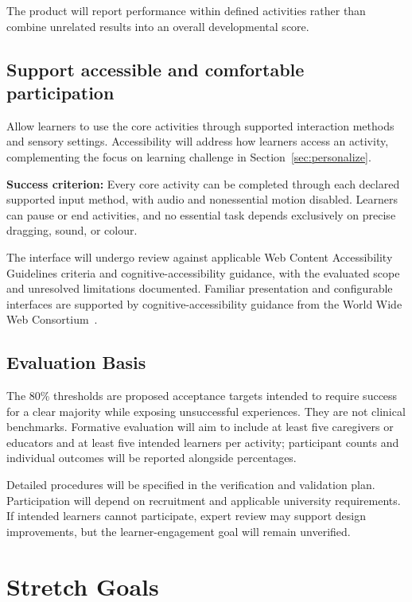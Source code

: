 \documentclass{article}
\begin{document}
The product will report performance within defined activities rather than
combine unrelated results into an overall developmental score.

\subsection{Support accessible and comfortable participation}

Allow learners to use the core activities through supported interaction methods
and sensory settings. Accessibility will address how learners access an
activity, complementing the focus on learning challenge in
Section~\ref{sec:personalize}.

\textbf{Success criterion:} Every core activity can be completed through each
declared supported input method, with audio and nonessential motion disabled.
Learners can pause or end activities, and no essential task depends exclusively
on precise dragging, sound, or colour.

The interface will undergo review against applicable Web Content Accessibility
Guidelines criteria and cognitive-accessibility guidance, with the evaluated
scope and unresolved limitations documented. Familiar presentation and
configurable interfaces are supported by cognitive-accessibility guidance from
the World Wide Web Consortium~\citep{w3cPersonalization}.

\subsection*{Evaluation Basis}

The 80\% thresholds are proposed acceptance targets intended to require success
for a clear majority while exposing unsuccessful experiences. They are not
clinical benchmarks. Formative evaluation will aim to include at least five
caregivers or educators and at least five intended learners per activity;
participant counts and individual outcomes will be reported alongside
percentages.

Detailed procedures will be specified in the verification and validation plan.
Participation will depend on recruitment and applicable university requirements.
If intended learners cannot participate, expert review may support design
improvements, but the learner-engagement goal will remain unverified.

\section{Stretch Goals}
\end{document}
